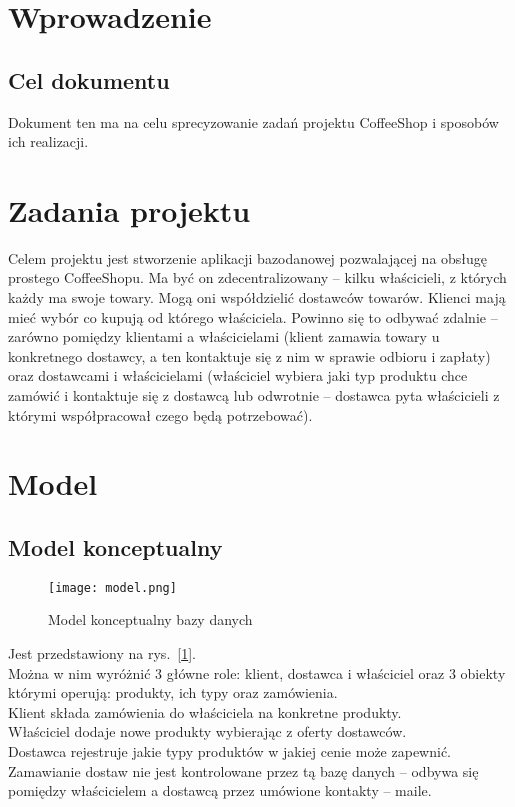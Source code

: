 


\tableofcontents
\clearpage
\section{Wprowadzenie}
\subsection{Cel dokumentu}
Dokument ten ma na celu sprecyzowanie zadań projektu CoffeeShop i sposobów ich realizacji.
\section{Zadania projektu}
Celem projektu jest stworzenie aplikacji bazodanowej pozwalającej na obsługę prostego CoffeeShopu. Ma być on zdecentralizowany -- kilku właścicieli, z których każdy ma swoje towary. Mogą oni współdzielić dostawców towarów. Klienci mają mieć wybór co kupują od którego właściciela. 
Powinno się to odbywać zdalnie -- zarówno pomiędzy klientami a właścicielami (klient zamawia towary u konkretnego dostawcy, a ten kontaktuje się z nim w sprawie odbioru i zapłaty) oraz dostawcami i właścicielami (właściciel wybiera jaki typ produktu chce zamówić i kontaktuje się z dostawcą lub odwrotnie -- dostawca pyta właścicieli z którymi współpracował czego będą potrzebować).
\section{Model}
\subsection{Model konceptualny}
\begin{figure}
  \texttt{[image: model.png]}
  \caption{Model konceptualny bazy danych}
  \label{konc}
\end{figure}
Jest przedstawiony na rys.~[\ref{konc}].\\
Można w nim wyróżnić 3 główne role: klient, dostawca i właściciel oraz 3 obiekty którymi operują: produkty, ich typy oraz zamówienia. \\
Klient składa zamówienia do właściciela na konkretne produkty.\\
Właściciel dodaje nowe produkty wybierając z oferty dostawców.\\
Dostawca rejestruje jakie typy produktów w jakiej cenie może zapewnić.\\
Zamawianie dostaw nie jest kontrolowane przez tą bazę danych -- odbywa się pomiędzy właścicielem a dostawcą przez umówione kontakty -- maile.
